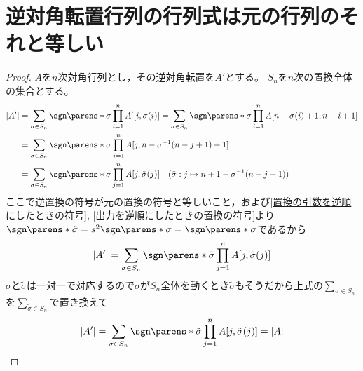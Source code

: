     \section{逆対角転置行列の行列式は元の行列のそれと等しい}
        \begin{proof}
            \quad\par
            $A$を$n$次対角行列とし，その逆対角転置を$A'$とする。
            $S_n$を$n$次の置換全体の集合とする。
            \begin{align*}
                |A'| &= \sum_{\sigma\in S_n} \sgn\parens*{\sigma} \prod_{i=1}^n A'[i,\sigma(i)] = \sum_{\sigma\in S_n} \sgn\parens*{\sigma} \prod_{i=1}^n A[n-\sigma(i)+1, n-i+1] \\
                &= \sum_{\sigma\in S_n} \sgn\parens*{\sigma} \prod_{j=1}^n A[j, n- \sigma^{-1}(n-j+1)+1] \\
                &= \sum_{\sigma\in S_n} \sgn\parens*{\sigma} \prod_{j=1}^n A[j, \tilde\sigma(j)] \quad (\tilde\sigma: j \mapsto n+1-\sigma^{-1}(n-j+1))
            \end{align*}
            ここで逆置換の符号が元の置換の符号と等しいこと，および\ref{置換の引数を逆順にしたときの符号}, \ref{出力を逆順にしたときの置換の符号}より$\sgn\parens*{\tilde\sigma} = s^2\sgn\parens*{\sigma} = \sgn\parens*{\sigma}$であるから
            \[ |A'| = \sum_{\sigma\in S_n} \sgn\parens*{\tilde\sigma} \prod_{j=1}^n A[j, \tilde\sigma(j)] \]
            $\sigma$と$\tilde\sigma$は一対一で対応するので$\sigma$が$S_n$全体を動くとき$\tilde\sigma$もそうだから上式の$\sum_{\sigma\in S_n}$を$\sum_{\tilde\sigma\in S_n}$で置き換えて
            \[ |A'| = \sum_{\tilde\sigma\in S_n} \sgn\parens*{\tilde\sigma} \prod_{j=1}^n A[j, \tilde\sigma(j)] = |A| \]
        \end{proof}
